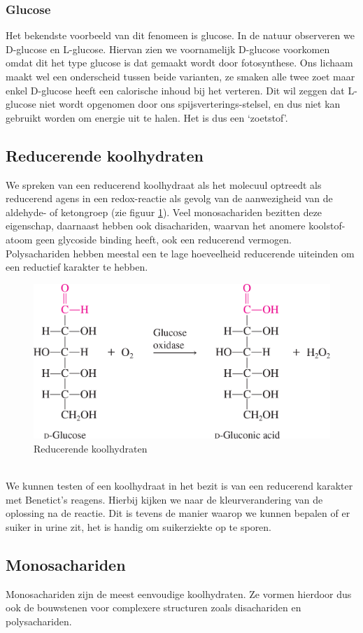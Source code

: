 \documentclass[a4paper,kul]{kulakarticle} %
\begin{document}
\subsubsection{Glucose}
Het bekendste voorbeeld van dit fenomeen is glucose. In de natuur observeren we D-glucose en L-glucose. Hiervan zien we voornamelijk D-glucose voorkomen omdat dit het type glucose is dat gemaakt wordt door fotosynthese. Ons lichaam maakt wel een onderscheid tussen beide varianten, ze smaken alle twee zoet maar enkel D-glucose heeft een calorische inhoud bij het verteren. Dit wil zeggen dat L-glucose niet wordt opgenomen door ons spijsverterings-stelsel, en dus niet kan  gebruikt worden om energie uit te halen. Het is dus een `zoetstof'.

\subsection{Reducerende koolhydraten}
We spreken van een reducerend koolhydraat als het molecuul optreedt als reducerend agens in een redox-reactie als gevolg van de aanwezigheid van de aldehyde- of ketongroep (zie figuur \ref{fig:reductiefding}). Veel monosachariden bezitten deze eigenschap, daarnaast hebben ook disachariden, waarvan het anomere koolstof-atoom geen glycoside binding heeft, ook een reducerend vermogen. Polysachariden hebben meestal een te lage hoeveelheid reducerende uiteinden om een reductief karakter te hebben.
\begin{figure}[htbp]
	\centering
	\includegraphics[width=0.5\linewidth]{ReductiefDing}
	\caption[Reducerende koolhydraten]{Reducerende koolhydraten}
	\label{fig:reductiefding}
\end{figure}\\
We kunnen testen of een koolhydraat in het bezit is van een reducerend karakter met Benetict's reagens. Hierbij kijken we naar de kleurverandering van de oplossing na de reactie. Dit is tevens de manier waarop we kunnen bepalen of er suiker in urine zit, het is handig om suikerziekte op te sporen.

\subsection{Monosachariden}
Monosachariden zijn de meest eenvoudige koolhydraten. Ze vormen hierdoor dus ook de bouwstenen voor complexere structuren zoals disachariden en polysachariden. 
\end{document}
